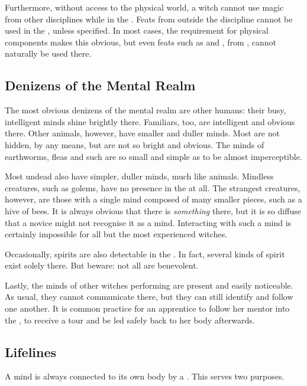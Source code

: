 Furthermore, without access to the physical world, a witch cannot use magic from other disciplines while in the {\mentalrealm}.
Feats from outside the  discipline cannot be used in the {\mentalrealm}, unless specified.
In most cases, the requirement for physical components makes this obvious, but even feats such as  and , from , cannot naturally be used there.

\subsection{Denizens of the Mental Realm}

The most obvious denizens of the mental realm are other humans: their busy, intelligent minds shine brightly there.
Familiars, too, are intelligent and obvious there.
Other animals, however, have smaller and duller minds.
Most are not hidden, by any means, but are not so bright and obvious.
The minds of earthworms, fleas and such are so small and simple as to be almost imperceptible.

Most undead also have simpler, duller minds, much like animals.
Mindless creatures, such as golems, have no presence in the {\mentalrealm} at all.
The strangest creatures, however, are those with a single mind composed of many smaller pieces, such as a hive of bees.
It is always obvious that there is \emph{something} there, but it is so diffuse that a novice might not recognise it as a mind.
Interacting with such a mind is certainly impossible for all but the most experienced witches.

Occasionally, spirits are also detectable in the {\mentalrealm}.
In fact, several kinds of spirit exist solely there.
But beware: not all are benevolent.

Lastly, the minds of other witches performing  are present and easily noticeable.
As usual, they cannot communicate there, but they can still identify and follow one another.
It is common practice for an apprentice to follow her mentor into the {\mentalrealm}, to receive a tour and be led safely back to her body afterwards.

\subsection{Lifelines}

A mind is always connected to its own body by a {\lifeline}.
This {\lifeline} serves two purposes.

